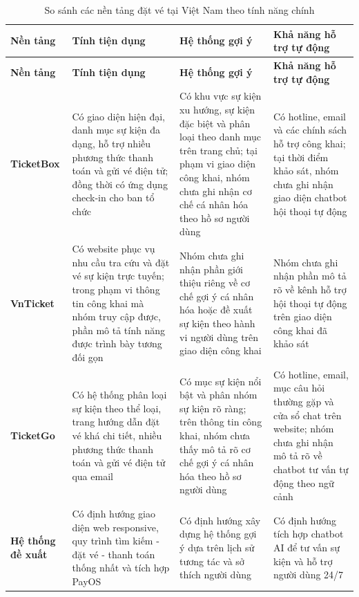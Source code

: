 \renewcommand{\arraystretch}{1.3}
\setlength{\tabcolsep}{4pt}
\setlength{\LTleft}{0pt}
\setlength{\LTright}{0pt}
\begin{longtable}{|p{}|p{}|p{}|p{}|}
\caption{So sánh các nền tảng đặt vé tại Việt Nam theo tính năng chính}\label{tab:so_sanh_he_thong_ve}\\[15pt]
\hline
\textbf{Nền tảng} & \textbf{Tính tiện dụng} & \textbf{Hệ thống gợi ý} & \textbf{Khả năng hỗ trợ tự động} \\ \hline
\endfirsthead

\hline
\textbf{Nền tảng} & \textbf{Tính tiện dụng} & \textbf{Hệ thống gợi ý} & \textbf{Khả năng hỗ trợ tự động} \\ \hline
\endhead

\hline
\endfoot

\endlastfoot

\textbf{TicketBox} 
& Có giao diện hiện đại, danh mục sự kiện đa dạng, hỗ trợ nhiều phương thức thanh toán và gửi vé điện tử; đồng thời có ứng dụng check-in cho ban tổ chức 
& Có khu vực sự kiện xu hướng, sự kiện đặc biệt và phân loại theo danh mục trên trang chủ; tại phạm vi giao diện công khai, nhóm chưa ghi nhận cơ chế cá nhân hóa theo hồ sơ người dùng 
& Có hotline, email và các chính sách hỗ trợ công khai; tại thời điểm khảo sát, nhóm chưa ghi nhận giao diện chatbot hội thoại tự động \\ \hline

\textbf{VnTicket} 
& Có website phục vụ nhu cầu tra cứu và đặt vé sự kiện trực tuyến; trong phạm vi thông tin công khai mà nhóm truy cập được, phần mô tả tính năng được trình bày tương đối gọn 
& Nhóm chưa ghi nhận phần giới thiệu riêng về cơ chế gợi ý cá nhân hóa hoặc đề xuất sự kiện theo hành vi người dùng trên giao diện công khai 
& Nhóm chưa ghi nhận phần mô tả rõ về kênh hỗ trợ hội thoại tự động trên giao diện công khai đã khảo sát \\ \hline

\textbf{TicketGo} 
& Có hệ thống phân loại sự kiện theo thể loại, trang hướng dẫn đặt vé khá chi tiết, nhiều phương thức thanh toán và gửi vé điện tử qua email 
& Có mục sự kiện nổi bật và phân nhóm sự kiện rõ ràng; trên thông tin công khai, nhóm chưa thấy mô tả rõ cơ chế gợi ý cá nhân hóa theo hồ sơ người dùng 
& Có hotline, email, mục câu hỏi thường gặp và cửa sổ chat trên website; nhóm chưa ghi nhận mô tả rõ về chatbot tư vấn tự động theo ngữ cảnh \\ \hline

\textbf{Hệ thống đề xuất} 
& Có định hướng giao diện web responsive, quy trình tìm kiếm - đặt vé - thanh toán thống nhất và tích hợp PayOS 
& Có định hướng xây dựng hệ thống gợi ý dựa trên lịch sử tương tác và sở thích người dùng 
& Có định hướng tích hợp chatbot AI để tư vấn sự kiện và hỗ trợ người dùng 24/7 \\ \hline
\end{longtable}

